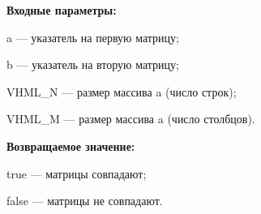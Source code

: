\textbf{Входные параметры:}

a --- указатель на первую матрицу;
 
b --- указатель на вторую матрицу;
 
VHML\_N --- размер массива a (число строк);
 
VHML\_M --- размер массива a (число столбцов).

\textbf{Возвращаемое значение:}
 
 true --- матрицы совпадают;
 
false --- матрицы не совпадают.